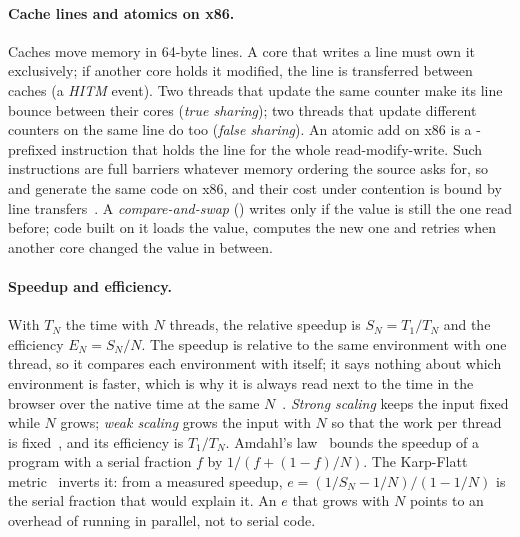 \paragraph{Cache lines and atomics on x86.} Caches move memory in 64-byte
lines. A core that writes a line must own it exclusively; if another core
holds it modified, the line is transferred between caches (a \emph{HITM}
event). Two threads that update the same counter make its line bounce
between their cores (\emph{true sharing}); two threads that update different
counters on the same line do too (\emph{false sharing}). An atomic add on
x86 is a -prefixed instruction that holds the line for the whole
read-modify-write. Such instructions are full barriers whatever memory
ordering the source asks for, so  and  generate
the same code on x86, and their cost under contention is bound by line
transfers~\cite{schweizer2015}. A \emph{compare-and-swap} () writes only if the value is still the one read before; code built
on it loads the value, computes the new one and retries when another core
changed the value in between.

\paragraph{Speedup and efficiency.} With $T_N$ the time with $N$ threads,
the relative speedup is $S_N = T_1/T_N$ and the efficiency $E_N = S_N/N$.
The speedup is relative to the same environment with one thread, so it
compares each environment with itself; it says nothing about which
environment is faster, which is why it is always read next to the time in
the browser over the native time at the same $N$~\cite{hoefler2015}.
\emph{Strong scaling} keeps the input fixed while $N$ grows; \emph{weak
scaling} grows the input with $N$ so that the work per thread is
fixed~\cite{gustafson1988}, and its efficiency is $T_1/T_N$. Amdahl's
law~\cite{amdahl1967} bounds the speedup of a program with a serial fraction
$f$ by $1/(f + (1-f)/N)$. The Karp-Flatt metric~\cite{karp1990} inverts it:
from a measured speedup, $e = (1/S_N - 1/N)/(1 - 1/N)$ is the serial
fraction that would explain it. An $e$ that grows with $N$ points to an
overhead of running in parallel, not to serial code.
